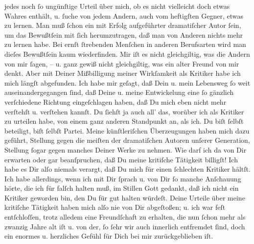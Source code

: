 \begin{ledgroupsized}[t]{13cm}
               jedes noch ſo ungünſtige Urteil über mich, ob es nicht vielleicht doch etwas Wahres
               enthält, u. ſuche von jedem Andern, auch vom heftigſten Gegner, etwas zu lernen. Man
               muß ſchon ein mit Erfolg aufgeführter dramatiſcher Autor ſein, {\pb}um das Bewußtſein mit ſich herumzutragen, daß
               man von Anderen nichts mehr zu lernen habe. Bei ernſt ſtrebenden Menſchen in anderen
               Berufsarten wird man dieſes Bewußtſein kaum wiederfinden.\pend
           \pstart
           Mir iſt es nicht gleichgiltig, was die Andern von mir ſagen, – u. ganz gewiß nicht
               gleichgiltig, was ein alter Freund von mir denkt. Aber mit Deiner Mißbilligung meiner
               Wirkſamkeit als Kritiker habe ich mich \introOben{}längſt\introOben{} abgefunden.
               Ich habe mir geſagt, daß Dein u. mein Lebensweg ſo
               weit auseinandergegangen ſind, {\pb}daß Deine u. meine
               Entwickelung eine ſo gänzlich verſchiedene Richtung eingeſchlagen haben, daß Du mich
               eben nicht mehr verſtehſt u. verſtehen kannſt. Du ſiehſt ja auch all’ das, worüber
               ich als Kritiker zu urteilen habe, von einem ganz anderen Standpunkt an, als ich. Du
               biſt ſelbſt beteiligt, biſt ſelbſt Partei. Meine künſtleriſchen Überzeugungen haben
               mich dazu geführt, Stellung gegen  die meiſten der dramatiſchen Autoren unſerer Generation, Stellung ſogar gegen
               manches Deiner Werke zu nehmen. {\pb}Wie darf ich da
               von Dir erwarten oder gar beanſpruchen, daß Du meine kritiſche Tätigkeit
               billigſt!\pend
           \pstart
           Ich habe es Dir alſo niemals verargt, daß Du mich für einen ſchlechten Kritiker
               hältſt. Ich habe allerdings, wenn ich mit Dir ſprach u. von Dir ſo manche Anſchauung
               hörte, die ich für falſch halten muß, im Stillen Gott gedankt, daß ich nicht ein
               Kritiker geworden bin, den Du für gut halten würdeſt.\pend
           \pstart
           {\pb}Deine Urteile über meine kritiſche Tätigkeit
               haben mich alſo nie von Dir abgeſtoßen; u. ich war feſt entſchloſſen, trotz alledem
                  \strikeout{\textcolor{gray}{Dir}} eine Freundſchaft zu erhalten, die nun ſchon mehr als zwanzig Jahre alt
                  iſt\strikeout{,} u. von der, ſo ſehr wir auch innerlich
               entfremdet ſind, doch ein enormes u. herzliches Gefühl für Dich bei mir
               zurückgeblieben iſt. \strikeout{\textcolor{gray}{×}}\pend

\end{ledgroupsized}
